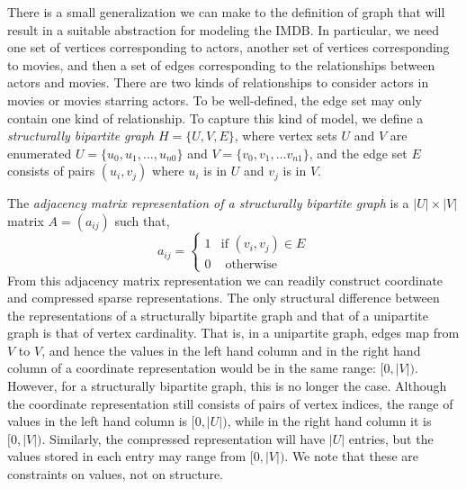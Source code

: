 There is a small generalization we can make to the definition of graph that will result in a suitable abstraction for modeling the IMDB.  In particular, we need one set of vertices corresponding to actors, another set of vertices corresponding to movies, and then a set of edges corresponding to the relationships between actors and movies.  There are two kinds of relationships to consider actors in movies or movies starring actors.  To be well-defined, the edge set may only contain one kind of relationship.  To capture this kind of model, we define a \emph{structurally bipartite graph} $H = \{ U, V, E \}$, where vertex sets $U$ and $V$ are enumerated $U = \{ u_0, u_1, \ldots , u_{n0} \}$ and $V  = \{ v_0, v_1, \ldots v_{n1}\}$, 
and the edge set $E$ consists of pairs $(u_i, v_j)$ where $u_i$ is in $U$ and $v_j$ is in $V$.

The \emph{adjacency matrix representation of a structurally bipartite graph} is
a $|U|\times |V|$ matrix $A = (a_{ij})$ such that,
\[
 a_{i j} = 
 \left\{
 \begin{array}{rl}
  1 & \textrm{if } (v_i, v_j) \in E \\
  0 & \textrm { otherwise }
 \end{array}
 \right.
 \]
From this adjacency matrix representation we can readily construct  coordinate and compressed sparse representations.  The only structural difference between the representations of a structurally bipartite graph and that of a unipartite graph is that of vertex cardinality.  That is, in a unipartite graph, edges map from $V$ to $V$, and hence the values in the left hand column and in the right hand column of a coordinate representation would be in the same range: $[0, |V|)$.  However, for a structurally bipartite graph, this is no longer the case.  Although the coordinate representation still consists of pairs of vertex indices, the range of values in the left hand column is $[0, |U|)$, while in the right hand column it is $[0, |V|)$.  Similarly, the compressed representation will have $|U|$ entries, but the values stored in each entry may range from $[0, |V|)$.  We note that these are constraints on values, not on structure.
 

